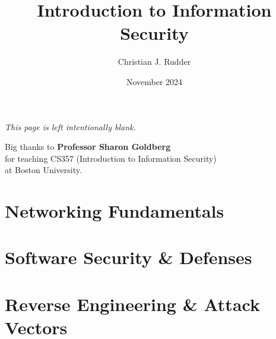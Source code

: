 \documentclass{memoir}
\title{Introduction to Information Security}
\author{Christian J. Rudder}
\date{November 2024}
\begin{document}
\maketitle
\setcounter{tocdepth}{2}

\tableofcontents

\newpage
\thispagestyle{empty}
\mbox{}
\vfill
\begin{center}
    \textit{This page is left intentionally blank.}
\end{center}
\vfill
\newpage
\thispagestyle{empty}
\mbox{}
\vfill
\begin{center}
    \Large{Big thanks to \textbf{Professor Sharon Goldberg}}\\
    \normalsize 
    for teaching CS357 (Introduction to Information Security)\\
    at Boston University.\\

    
    
\end{center}
\vfill

% 
% 
% 
% 
% 

\chapter{Networking Fundamentals}


\chapter{Software Security \& Defenses}


\noindent



\chapter{Reverse Engineering \& Attack Vectors}



\end{document}
